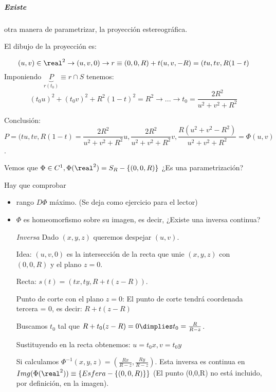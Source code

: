  \subparagraph{Existe} otra manera de parametrizar, la proyección estereográfica.  

El dibujo de la proyección es:

 
 
 \[(u,v) \in \real^2 \rightarrow (u,v,0) \rightarrow r\equiv (0,0,R) + t(u,v,-R) = (tu,tv,R(1-t)\]
 Imponiendo $\underbrace{P}_{r(t_0)} \equiv r\cap S$ tenemos: \[(t_0u)^2+(t_0v)^2 + R^2(1-t)^2 = R^2 \rightarrow ... \rightarrow t_0 = \frac{2R^2}{u^2+v^2+R^2}\]
 
 Conclusión: \[P = (tu,tv,R(1-t) = \frac{2R^2}{u^2+v^2+R^2}u,\frac{2R^2}{u^2+v^2+R^2}v,\frac{R(u^2+v^2-R^2)}{u^2+v^2+R^2} = \Phi(u,v)\].
 
 Vemos que $\Phi\in C^1, \Phi(\real^2) = S_R-\{(0,0,R)\}$ ¿Es una parametrización?
 
 Hay que comprobar \begin{itemize}
 \item rango $D\Phi$ máximo. (Se deja como ejercicio para el lector)
 \item $\Phi$ es homeomorfismo sobre su imagen, es decir, ¿Existe una inversa continua? 
 
 \emph{Inversa}
 Dado $(x,y,z)$ queremos despejar $(u,v)$.
 
 Idea: $(u,v,0)$ es la intersección de la recta que unie $(x,y,z)$ con $(0,0,R)$ y el plano $z=0$.
 
 Recta: $s(t) = (tx,ty,R+t(z-R))$.
 
 Punto de corte con el plano $z=0$: El punto de corte tendrá coordenada tercera = 0, es decir: 
 $R+t(z-R)$
 
 Buscamos $t_0$ tal que $R+t_0(z-R)=0 \dimplies t_0=\frac{R}{R-z}$.
 
 Sustituyendo en la recta obtenemos: $u = t_0x, v=t_0y$
 
 Si calculamos $\Phi^{-1}(x,y,z) = \left(\frac{Rx}{R-z},\frac{Ry}{R-z}\right)$. Esta inversa es continua en $Img(\Phi(\real^2)) \equiv \{Esfera - \{(0,0,R)\}\}$  (El punto (0,0,R) no está incluido, por definición, en la imagen).
 
 \end{itemize}
